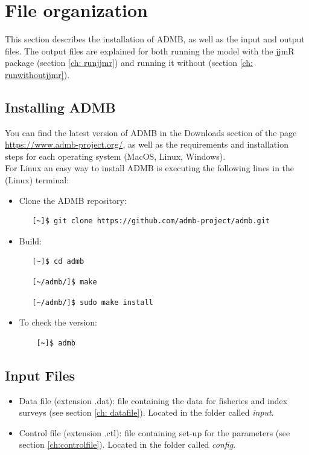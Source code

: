 \documentclass{article}
\begin{document}
\section{File organization}

This section describes the installation of ADMB, as well as the input and output files. The output files are explained for both running the model with the jjmR package (section \ref{ch: runjjmr}) and running it without (section \ref{ch: runwithoutjjmr}).


\subsection{Installing ADMB} \label{ch: installadmb}
You can find the latest version of ADMB in the Downloads section of the page \url{https://www.admb-project.org/}, as well as the requirements and installation steps for each operating system (MacOS, Linux, Windows). \\
For Linux an easy way to install ADMB is executing the following lines in the (Linux) terminal:
\begin{itemize}
\item Clone the ADMB repository:
\begin{lstlisting}
   [~]$ git clone https://github.com/admb-project/admb.git
\end{lstlisting}
\item Build: 
\begin{lstlisting}
   [~]$ cd admb
\end{lstlisting}
\begin{lstlisting}
   [~/admb/]$ make
\end{lstlisting}
\begin{lstlisting}
   [~/admb/]$ sudo make install
\end{lstlisting}
\item To check the version:
\begin{lstlisting}
    [~]$ admb
\end{lstlisting}
\end{itemize}


\subsection{Input Files}
\begin{itemize}
\item Data file (extension .dat): file containing the data for fisheries and index surveys (see section \ref{ch: datafile}). Located in the folder called \textit{input}.
\item Control file (extension .ctl): file containing set-up for the parameters (see section \ref{ch:controlfile}). Located in the folder called \textit{config}.    
    
\end{itemize}
\end{document}
